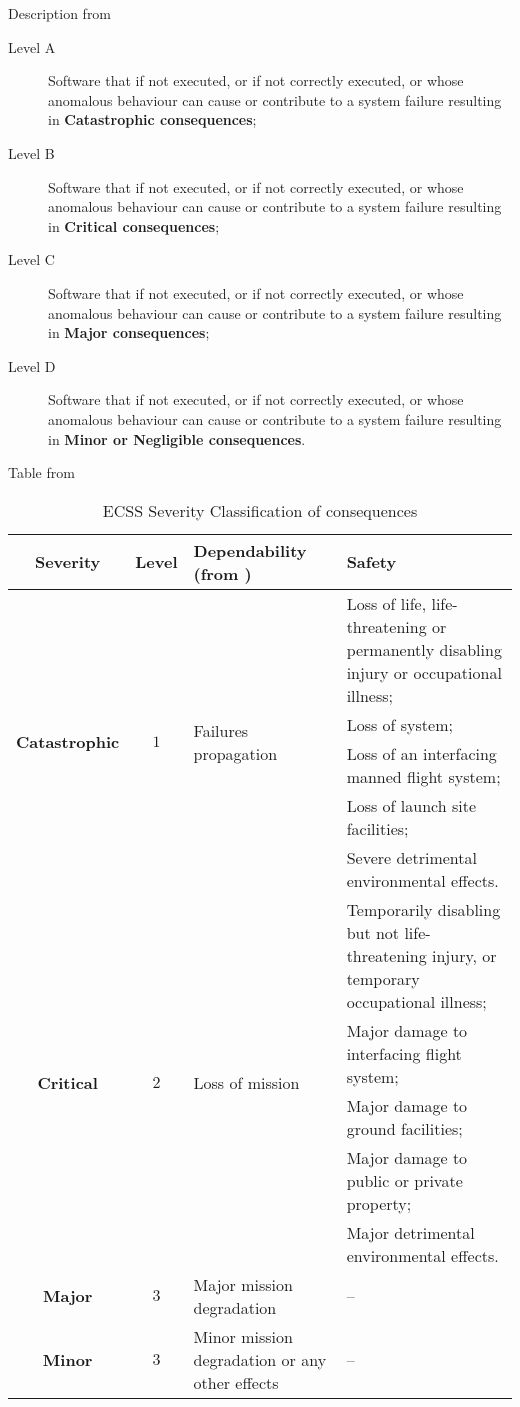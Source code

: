 {Description from\cite{ecss-q-st-80c}
\begin{description}
\item[Level A] Software that if not executed, or if not correctly executed, or whose anomalous behaviour can cause or contribute to a system failure resulting in \textbf{Catastrophic consequences};
\item[Level B] Software that if not executed, or if not correctly executed, or whose anomalous behaviour can cause or contribute to a system failure resulting in \textbf{Critical consequences};
\item[Level C] Software that if not executed, or if not correctly executed, or whose anomalous behaviour can cause or contribute to a system failure resulting in \textbf{Major consequences};
\item[Level D] Software that if not executed, or if not correctly executed, or whose anomalous behaviour can cause or contribute to a system failure resulting in \textbf{Minor or Negligible consequences}.
\end{description}

Table from \cite{ecss-q-st-40c}
\begin{table}[!ht]
\centering
\noindent \begin{tabular}{|c|c|m{4cm}|m{5cm}|}\hline
\textbf{Severity} & \textbf{Level} & \textbf{Dependability (from \cite{ecss-q-st-30c})} & \textbf{Safety}\\\hline\hline
\multirow{5}{*}{\textbf{Catastrophic}} & \multirow{5}{*}{$1$} & \multirow{5}{*}{Failures propagation} & 
Loss of life, life-threatening or permanently disabling injury or occupational illness;\\\cline{4-4}
& & & Loss of system;  \\ \cline{4-4}
& & & Loss of an interfacing manned flight system; \\ \cline{4-4}
& & & Loss of launch site facilities;  \\ \cline{4-4}
& & & Severe detrimental environmental effects.  \\\hline\hline
\multirow{5}{*}{\textbf{Critical}} & \multirow{5}{*}{$2$} & \multirow{5}{*}{Loss of mission} & 
Temporarily disabling but not life-threatening injury, or temporary occupational illness;\\\cline{4-4}
& & & Major damage to interfacing flight system;  \\ \cline{4-4}
& & & Major damage to ground facilities; \\ \cline{4-4}
& & & Major damage to public or private property;  \\ \cline{4-4}
& & & Major detrimental environmental effects.  \\\hline\hline
\textbf{Major} & $3$ & Major mission degradation & --\\\hline\hline
\textbf{Minor} & $3$ & Minor mission degradation or any other effects & --\\\hline
\end{tabular}
\caption{\protect\ac{ECSS} Severity Classification of consequences}\label{tab:severity}
\end{table}

}
